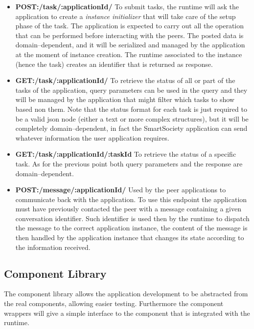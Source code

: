 \begin{itemize}
\item {\bf POST:/task/:applicationId/} To submit tasks, the runtime will ask the application to create a \textit{instance initializer} that will take care of the setup phase of the task. The application is expected to carry out all the operation that can be performed before interacting with the peers. The posted data is domain--dependent, and it will be serialized and managed by the application at the moment of instance creation. The runtime associated to the instance (hence the task) creates an identifier that is returned as response.

\item {\bf GET:/task/:applicationId/} To retrieve the status of all or part of the tasks of the application, query parameters can be used in the query and they will be managed by the application that might filter which tasks to show based non them. Note that the status format for each task is just required to be a valid json node (either a text or more complex structures), but it will be completely domain--dependent, in fact the SmartSociety application can send whatever information the user application requires.

\item {\bf GET:/task/:applicationId/:taskId} To retrieve the status of a specific task. As for the previous point both query parameters and the response are domain--dependent. 

\item {\bf POST:/message/:applicationId/} Used by the peer applications to communicate back with the application. To use this endpoint the application must have previously contacted the peer with a message containing a given conversation identifier. Such identifier is used then by the runtime to dispatch the message to the correct application instance, the content of the message is then handled by the application instance that  changes its state according to the information received.

\end{itemize}

\subsection{Component Library}

The component library allows the application development to be abstracted from the real components, allowing easier testing. 
Furthermore the component wrappers will give a simple interface to the component that is integrated with the runtime.


